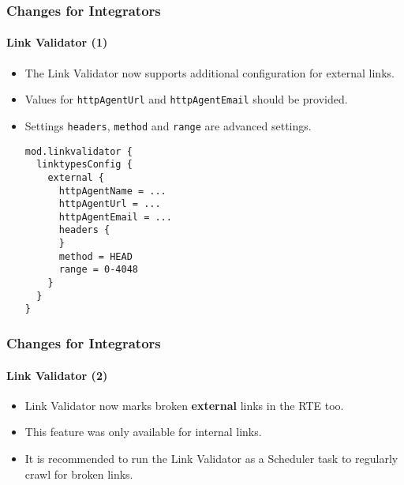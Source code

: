 
\begin{frame}[fragile]
	\frametitle{Changes for Integrators}
	\framesubtitle{Link Validator (1)}

	\lstset{basicstyle=\tiny\ttfamily}

	\begin{itemize}
		\item The Link Validator now supports additional configuration for external links.
		\item Values for \texttt{httpAgentUrl} and \texttt{httpAgentEmail} should be provided.
		\item Settings \texttt{headers}, \texttt{method} and \texttt{range} are advanced settings.
\begin{lstlisting}
mod.linkvalidator {
  linktypesConfig {
    external {
      httpAgentName = ...
      httpAgentUrl = ...
      httpAgentEmail = ...
      headers {
      }
      method = HEAD
      range = 0-4048
    }
  }
}
\end{lstlisting}

	\end{itemize}

\end{frame}


\begin{frame}[fragile]
	\frametitle{Changes for Integrators}
	\framesubtitle{Link Validator (2)}

	\begin{itemize}
		\item Link Validator now marks broken \textbf{external} links in the RTE too.
		\item This feature was only available for internal links.
		\item It is recommended to run the Link Validator as a Scheduler task to regularly crawl for broken links.
	\end{itemize}

\end{frame}

